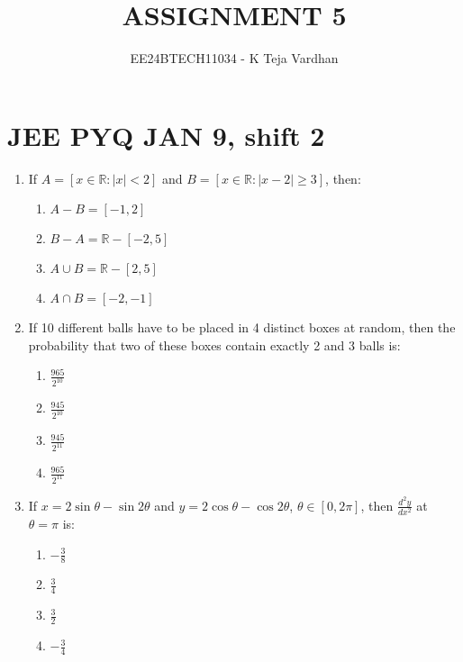 \documentclass[journal]{IEEEtran}
\newcommand{\sbrak}[1]{\left[ #1 \right]}
\newcommand{\abs}[1]{\left| #1 \right|}
\begin{document}

\title{ASSIGNMENT 5}
\author{EE24BTECH11034 - K Teja Vardhan}
{\let\newpage\relax\maketitle}

\section{JEE PYQ JAN 9, shift 2}
\begin{enumerate}

    \item If \( A = \sbrak{ x \in \mathbb{R} : \abs{x} < 2 } \) and \( B = \sbrak{ x \in \mathbb{R} : \abs{x - 2} \geq 3 } \), then:
        \begin{enumerate}
            \item \( A - B = \sbrak{ -1, 2 } \)  
            \item \( B - A = \mathbb{R} - \sbrak{ -2, 5 } \)  
            \item \( A \cup B = \mathbb{R} - \sbrak{ 2, 5 } \)  
            \item \( A \cap B = \sbrak{ -2, -1 } \)
        \end{enumerate}   

    \item If 10 different balls have to be placed in 4 distinct boxes at random, then the probability that two of these boxes contain exactly 2 and 3 balls is:
        \begin{multicols}{4}
        \begin{enumerate}
            \item \( \frac{965}{2^{10}} \)  
            \item \( \frac{945}{2^{10}} \)  
            \item \( \frac{945}{2^{11}} \)  
            \item \( \frac{965}{2^{11}} \)
        \end{enumerate}
        \end{multicols}

    \item If \( x = 2 \sin \theta - \sin 2 \theta \) and \( y = 2 \cos \theta - \cos 2 \theta \), \( \theta \in \sbrak{ 0, 2\pi } \), then \( \frac{d^2y}{dx^2} \) at \( \theta = \pi \) is:
        \begin{multicols}{4}
        \begin{enumerate}
            \item \( -\frac{3}{8} \)  
            \item \( \frac{3}{4} \)  
            \item \( \frac{3}{2} \)  
            \item \( -\frac{3}{4} \)
        \end{enumerate}
        \end{multicols}


\end{enumerate}
\end{document}
